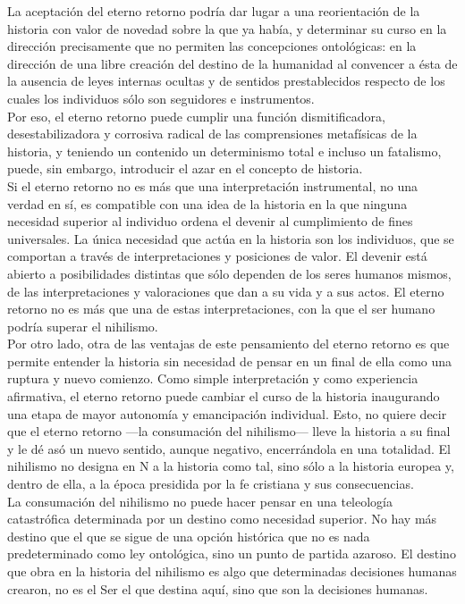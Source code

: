 \documentclass[a4paper, 10pt, twocolumn, spanish]{article}
\begin{document}
La aceptación del eterno retorno podría dar lugar a una reorientación
de la historia con valor de novedad sobre la que ya había, y
determinar su curso en la dirección precisamente que no permiten las
concepciones ontológicas: en la dirección de una libre creación del
destino de la humanidad al convencer a ésta de la ausencia de leyes
internas ocultas y de sentidos prestablecidos respecto de los cuales
los individuos sólo son seguidores e instrumentos.\\[0pt]
Por eso, el eterno retorno puede cumplir una función dismitificadora,
desestabilizadora y corrosiva radical de las comprensiones metafísicas
de la historia, y teniendo un contenido un determinismo total e
incluso un fatalismo, puede, sin embargo, introducir el azar en el
concepto de historia.\\[0pt]

Si el eterno retorno no es más que una interpretación instrumental, no
una verdad en sí, es compatible con una idea de la historia en la que
ninguna necesidad superior al individuo ordena el devenir al
cumplimiento de fines universales. La única necesidad que actúa en la
historia son los individuos, que se comportan a través de
interpretaciones y posiciones de valor. El devenir está abierto a
posibilidades distintas que sólo dependen de los seres humanos mismos,
de las interpretaciones y valoraciones que dan a su vida y a sus
actos. El eterno retorno no es más que una de estas interpretaciones,
con la que el ser humano podría superar el nihilismo.\\[0pt]

Por otro lado, otra de las ventajas de este pensamiento del eterno
retorno es que permite entender la historia sin necesidad de pensar en
un final de ella como una ruptura y nuevo comienzo. Como simple
interpretación y como experiencia afirmativa, el eterno retorno puede
cambiar el curso de la historia inaugurando una etapa de mayor
autonomía y emancipación individual. Esto, no quiere decir que el
eterno retorno —la consumación del nihilismo— lleve la historia a su
final y le dé asó un nuevo sentido, aunque negativo, encerrándola en
una totalidad. El nihilismo no designa en N a la historia como tal,
sino sólo a la historia europea y, dentro de ella, a la época
presidida por la fe cristiana y sus consecuencias.\\[0pt]

La consumación del nihilismo no puede hacer pensar en una teleología
catastrófica determinada por un destino como necesidad superior. No
hay más destino que el que se sigue de una opción histórica que no es
nada predeterminado como ley ontológica, sino un punto de partida
azaroso. El destino que obra en la historia del nihilismo es algo que
determinadas decisiones humanas crearon, no es el Ser el que destina
aquí, sino que son la decisiones humanas.\\[0pt]
\end{document}
